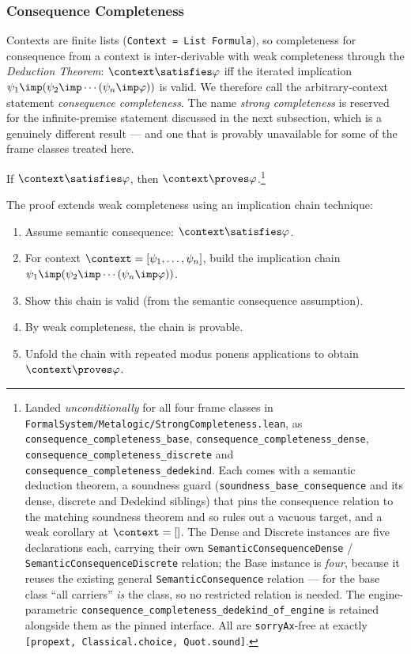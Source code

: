\documentclass[../BimodalReference.tex]{subfiles}
\begin{document}
\subsubsection{Consequence Completeness}

Contexts are finite lists (\texttt{Context = List Formula}), so completeness for consequence
from a context is inter-derivable with weak completeness through the \emph{Deduction Theorem}:
$\context \satisfies \varphi$ iff the iterated implication
$\psi_1 \imp (\psi_2 \imp \cdots (\psi_n \imp \varphi))$ is valid.
We therefore call the arbitrary-context statement \emph{consequence completeness}.
The name \emph{strong completeness} is reserved for the infinite-premise statement discussed in
the next subsection, which is a genuinely different result --- and one that is provably
unavailable for some of the frame classes treated here.

\begin{theorem}
If $\context \satisfies \varphi$, then $\context \proves \varphi$.\footnote{Landed
\emph{unconditionally} for all four frame classes in
\texttt{FormalSystem/Metalogic/StrongCompleteness.lean}, as
\texttt{consequence\_completeness\_base}, \texttt{consequence\_completeness\_dense},
\texttt{consequence\_completeness\_discrete} and \texttt{consequence\_completeness\_dedekind}.
Each comes with a semantic deduction theorem, a soundness guard
(\texttt{soundness\_base\_consequence} and its dense, discrete and Dedekind siblings) that pins
the consequence relation to the matching soundness theorem and so rules out a vacuous target,
and a weak corollary at $\context = []$. The Dense and Discrete instances are five declarations
each, carrying their own \texttt{SemanticConsequenceDense} / \texttt{SemanticConsequenceDiscrete}
relation; the Base instance is \emph{four}, because it reuses the existing general
\texttt{SemanticConsequence} relation --- for the base class ``all carriers'' \emph{is} the
class, so no restricted relation is needed. The engine-parametric
\texttt{consequence\_completeness\_dedekind\_of\_engine} is retained alongside them as the
pinned interface. All are \texttt{sorryAx}-free at exactly
\texttt{[propext, Classical.choice, Quot.sound]}.}
\end{theorem}

The proof extends weak completeness using an implication chain technique:
\begin{enumerate}
  \item Assume semantic consequence: $\context \satisfies \varphi$.
  \item For context $\context = [\psi_1, \ldots, \psi_n]$, build the implication chain $\psi_1 \imp (\psi_2 \imp \cdots (\psi_n \imp \varphi))$.
  \item Show this chain is valid (from the semantic consequence assumption).
  \item By weak completeness, the chain is provable.
  \item Unfold the chain with repeated modus ponens applications to obtain $\context \proves \varphi$.
\end{enumerate}
\end{document}
